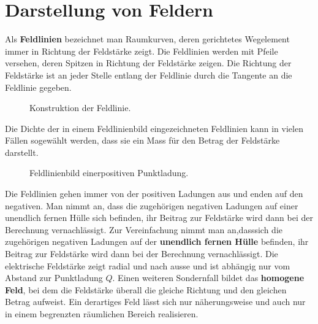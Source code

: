 \section{Darstellung von Feldern}
Als \textbf{Feldlinien} bezeichnet man Raumkurven, deren gerichtetes Wegelement immer in Richtung der Feldstärke zeigt. Die Feldlinien werden mit Pfeile versehen, deren Spitzen in Richtung der Feldstärke zeigen. Die Richtung der Feldstärke ist an jeder Stelle entlang der Feldlinie durch die Tangente an die Feldlinie gegeben.
\begin{figure}[H]
\centering
{}
\caption{Konstruktion der Feldlinie.}
\label{fig_Id}
\end{figure}
\noindent Die Dichte der in einem Feldlinienbild eingezeichneten Feldlinien kann in vielen Fällen sogewählt werden, dass sie ein Mass für den Betrag der Feldstärke darstellt. 
\begin{figure}[H]
\centering
{}
\caption{Feldlinienbild einerpositiven Punktladung.}
\label{fig_Ij}
\end{figure}
\noindent Die Feldlinien gehen immer von der positiven Ladungen aus und enden auf den negativen. Man nimmt an, dass die zugehörigen negativen Ladungen auf einer unendlich fernen Hülle sich befinden, ihr Beitrag zur Feldstärke wird dann bei der Berechnung vernachlässigt. Zur Vereinfachung nimmt man an,dasssich die zugehörigen negativen Ladungen auf der \textbf{unendlich fernen Hülle} befinden, ihr Beitrag zur Feldstärke wird dann bei der Berechnung vernachlässigt. Die elektrische Feldstärke zeigt radial und nach ausse und ist abhängig nur vom Abstand zur Punktladung $Q$.
\newline\newline
Einen weiteren Sondernfall bildet das \textbf{homogene Feld}, bei dem die Feldstärke überall die gleiche Richtung und den gleichen Betrag aufweist. Ein derartiges Feld lässt sich nur näherungsweise und auch nur in einem begrenzten räumlichen Bereich realisieren.
